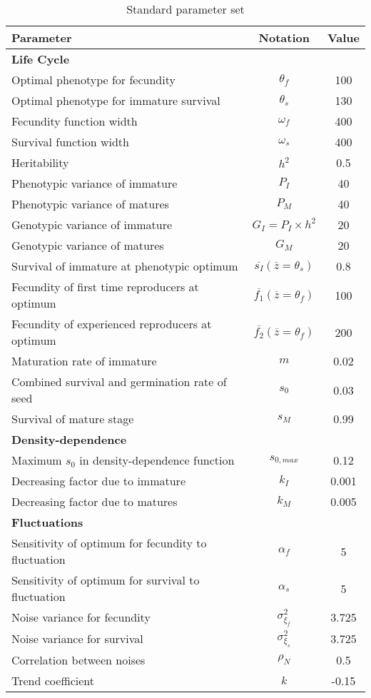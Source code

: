 \begin{table}
\begin{center}
	\begin{tabular}{l c c}
		\hline \hline
		Parameter & Notation & Value \\
		\hline
		\multicolumn{3}{l}{\textbf{Life Cycle}} \\
		Optimal phenotype for fecundity & $\theta_{f}$ & 100 \\
		Optimal phenotype for immature survival & $\theta_{s}$ & 130 \\
		Fecundity function width & $\omega_{f}$ & 400 \\
		Survival function width & $\omega_{s}$ & 400 \\
		Heritability & $h^2$ & 0.5 \\
		Phenotypic variance of immature & $P_{I}$ & 40 \\
		Phenotypic variance of matures & $P_{M}$ & 40 \\
		Genotypic variance of immature & $G_{I} = P_{I} \times h^2$ & 20 \\
		Genotypic variance of matures & $G_{M}$ & 20 \\
		Survival of immature at phenotypic optimum & $\overline{s_{I}}(\overline{z} = \theta_{s})$ & 0.8 \\
		Fecundity of first time reproducers at optimum & $\overline{f_{1}}(\overline{z} = \theta_{f})$ & 100 \\
		Fecundity of experienced reproducers at optimum & $\overline{f_{2}}(\overline{z} = \theta_{f})$ & 200 \\
		Maturation rate of immature & $m$ & 0.02 \\
		Combined survival and germination rate of seed & $s_{0}$ & 0.03 \\
		Survival of mature stage & $s_{M}$ & 0.99 \\
		\multicolumn{3}{l}{\textbf{Density-dependence}} \\
		Maximum $s_{0}$ in density-dependence function & $s_{0, max}$ & 0.12 \\
		Decreasing factor due to immature & $k_{I}$ & 0.001 \\
		Decreasing factor due to matures & $k_{M}$ & 0.005 \\
		\multicolumn{3}{l}{\textbf{Fluctuations}} \\
		Sensitivity of optimum for fecundity to fluctuation & $\alpha_{f}$ & 5 \\
		Sensitivity of optimum for survival to fluctuation & $\alpha_{s}$ & 5 \\
		Noise variance for fecundity & $\sigma_{\xi_{f}}^2$ & 3.725 \\
		Noise variance for survival & $\sigma_{\xi_{s}}^2$ & 3.725 \\
		Correlation between noises & $\rho_{N}$ & 0.5 \\
		Trend coefficient & $k$ & -0.15 \\
		\hline \hline
	\end{tabular}
	\caption{Standard parameter set}
	\label{tab:params}
\end{center}
\end{table}
